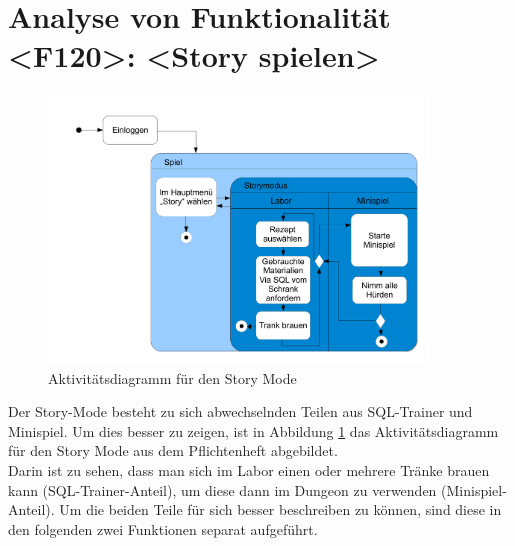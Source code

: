 \newpage
\section{Analyse von Funktionalität <F120>: <Story spielen>}
\begin{figure}[h]
\centering
\includegraphics[width=0.9\textwidth]{figures/Aktivitaetsdiagramm.pdf}
\caption{Aktivitätsdiagramm für den Story Mode}
\label{sequence_f120}
\end{figure}
Der Story-Mode besteht zu sich abwechselnden Teilen aus SQL-Trainer und Minispiel. Um dies  besser zu zeigen, ist in Abbildung \ref{sequence_f120} das Aktivitätsdiagramm für den Story Mode aus dem Pflichtenheft abgebildet.\\
Darin ist zu sehen, dass man sich im Labor einen oder mehrere Tränke brauen kann (SQL-Trainer-Anteil), um diese dann im Dungeon zu verwenden (Minispiel-Anteil).
Um die beiden Teile für sich besser beschreiben zu können, sind diese in den folgenden zwei Funktionen separat aufgeführt.

\newpage
